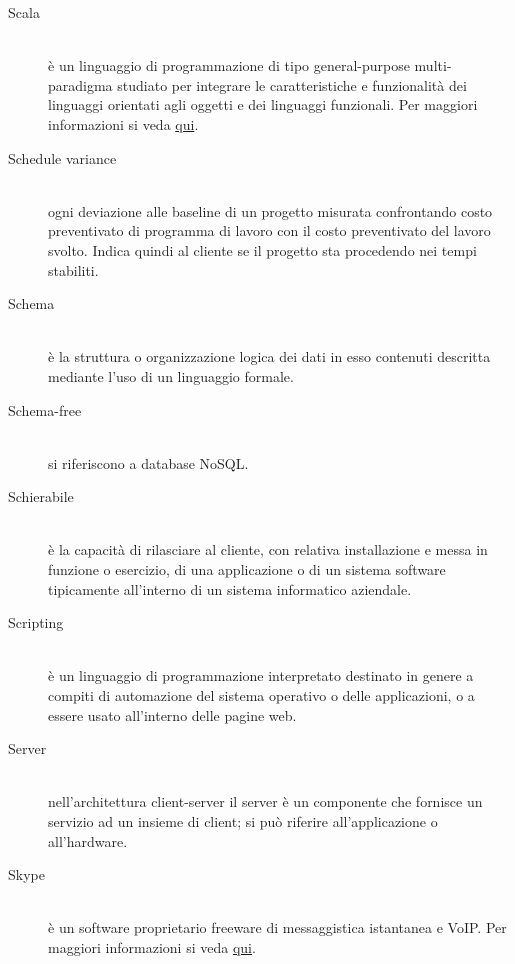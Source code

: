 \documentclass[12pt,a4paper]{article}
\begin{document}
\begin{description}
\item[Scala] 
\hfill\\è un linguaggio di programmazione di tipo general-purpose multi-paradigma studiato per integrare le caratteristiche e funzionalità dei linguaggi orientati agli oggetti e dei linguaggi funzionali. Per maggiori informazioni si veda \href{https://it.wikipedia.org/wiki/Scala_(linguaggio_di_programmazione)}{qui}.

\item[Schedule variance] 
\hfill\\ogni deviazione alle baseline di un progetto misurata confrontando costo preventivato di programma di lavoro con il costo preventivato del lavoro svolto. Indica quindi al cliente se il progetto sta procedendo nei tempi stabiliti.

\item[Schema] 
\hfill\\è la struttura o organizzazione logica dei dati in esso contenuti descritta mediante l'uso di un linguaggio formale.

\item[Schema-free] 
\hfill\\si riferiscono a database NoSQL.

\item[Schierabile] 
\hfill\\è la capacità di rilasciare al cliente, con relativa installazione e messa in funzione o esercizio, di una applicazione o di un sistema software tipicamente all'interno di un sistema informatico aziendale.

\item[Scripting] 
\hfill\\è un linguaggio di programmazione interpretato destinato in genere a compiti di automazione del sistema operativo o delle applicazioni, o a essere usato all'interno delle pagine web.

\item[Server] 
\hfill\\nell'architettura client-server il server è un componente che fornisce un servizio ad un insieme di client; si può riferire all'applicazione o all'hardware.

\item[Skype] 
\hfill\\è un software proprietario freeware di messaggistica istantanea e VoIP. Per maggiori informazioni si veda \href{https://it.wikipedia.org/wiki/Skype}{qui}.


\end{description}
\end{document}
